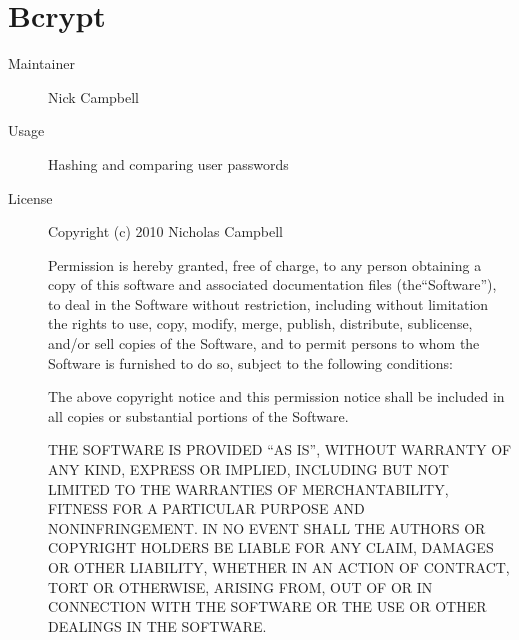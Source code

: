   \section*{Bcrypt}
    \begin{description}
      \item[Maintainer] Nick Campbell
      \item[Usage] Hashing and comparing user passwords
      \item[License] \scriptsize Copyright (c) 2010 Nicholas Campbell

        Permission is hereby granted, free of charge, to any person obtaining a copy
        of this software and associated documentation files (the``Software''), to deal
        in the Software without restriction, including without limitation the rights
        to use, copy, modify, merge, publish, distribute, sublicense, and/or sell
        copies of the Software, and to permit persons to whom the Software is
        furnished to do so, subject to the following conditions:

        The above copyright notice and this permission notice shall be included in
        all copies or substantial portions of the Software.

        THE SOFTWARE IS PROVIDED ``AS IS'', WITHOUT WARRANTY OF ANY KIND, EXPRESS OR
        IMPLIED, INCLUDING BUT NOT LIMITED TO THE WARRANTIES OF MERCHANTABILITY,
        FITNESS FOR A PARTICULAR PURPOSE AND NONINFRINGEMENT. IN NO EVENT SHALL THE
        AUTHORS OR COPYRIGHT HOLDERS BE LIABLE FOR ANY CLAIM, DAMAGES OR OTHER
        LIABILITY, WHETHER IN AN ACTION OF CONTRACT, TORT OR OTHERWISE, ARISING FROM,
        OUT OF OR IN CONNECTION WITH THE SOFTWARE OR THE USE OR OTHER DEALINGS IN
        THE SOFTWARE. 
    \end{description}

